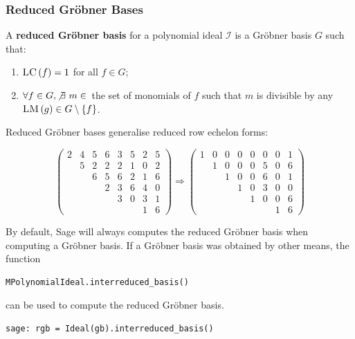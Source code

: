 \documentclass[9pt]{beamer}
\newcommand{\I}{\ensuremath{\mathcal{I}}\xspace}
\newcommand{\LM}[1]{\ensuremath{\textsc{LM}\left(#1\right)}\xspace}
\newcommand{\LC}[1]{\ensuremath{\textsc{LC}\left(#1\right)}\xspace}
\begin{document}
\begin{frame}
\frametitle{Reduced Gröbner Bases} 

\begin{definition}
A \textbf{reduced Gröbner basis} for a polynomial ideal $\I$ is a
Gröbner basis $G$ such that:
\begin{enumerate}
\item $\LC{f} = 1$ for all $f \in G$;
\item $\forall f \in G, \not\exists\ m \in $\ the set of monomials of $f$ such that $m$ is divisible by any $\LM{g} \in G \setminus \{f\}$.
\end{enumerate}
\end{definition}

\vspace{1em}
Reduced Gröbner bases generalise reduced row echelon forms:

\[
\left(\begin{array}{rrrrrrrr}
2 & 4 & 5 & 6 & 3 & 5 & 2 & 5 \\
  & 5 & 2 & 2 & 2 & 1 & 0 & 2 \\
  &   & 6 & 5 & 6 & 2 & 1 & 6 \\
  &   &   & 2 & 3 & 6 & 4 & 0 \\
  &   &   &   & 3 & 0 & 3 & 1 \\
  &   &   &   &   &   & 1 & 6
\end{array}\right)
\Rightarrow 
\left(\begin{array}{rrrrrrrr}
1 & 0 & 0 & 0 & 0 & 0 & 0 & 1 \\
  & 1 & 0 & 0 & 0 & 5 & 0 & 6 \\
  &   & 1 & 0 & 0 & 6 & 0 & 1 \\
  &   &   & 1 & 0 & 3 & 0 & 0 \\
  &   &   &   & 1 & 0 & 0 & 6 \\
  &   &   &   &   &   & 1 & 6
\end{array}\right)
\]

\framebreak

\framebreak

By default, Sage will always computes the reduced Gröbner basis when computing a Gröbner basis. If a Gröbner basis was obtained by other means, the function 
\begin{lstlisting}
MPolynomialIdeal.interreduced_basis()
\end{lstlisting}
can be used to compute the reduced Gröbner basis.
\begin{lstlisting}
sage: rgb = Ideal(gb).interreduced_basis()
\end{lstlisting}

\end{frame}
\end{document}
